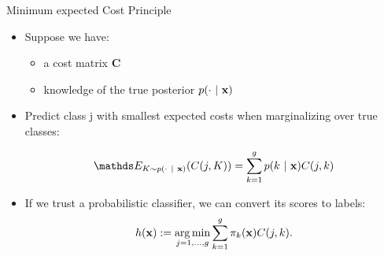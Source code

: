 \documentclass[10pt,compress,t,notes=noshow, xcolor=table]{beamer}
\begin{document}
\begin{frame}{Minimum expected Cost Principle}


		\begin{itemize}
		
			\item Suppose we have:
            \begin{itemize}
                \item a cost matrix $\mathbf{C}$
                
                \item knowledge of the true posterior $p(\cdot ~|~ \mathbf{x})$
            \end{itemize}

                

			\item Predict class j with smallest expected costs when marginalizing over true classes:
	
			$$ 	\E_{K \sim p(\cdot ~|~ \xv)}( C(j,K) ) = \sumkg p(k ~|~ \xv) C(j,k)	$$
	
		\end{itemize}

    \begin{itemize}
        \item If we trust a probabilistic classifier, we can convert its scores to labels:
		$$  h(\mathbf{x}) := \mathop{\mathrm{arg\,min}}\limits_{j=1,\ldots,g} \sum\limits_{k=1}^g 	\pi_{k}(\mathbf{x}) C(j,k). $$
 
        

\end{itemize}
\end{frame}
\end{document}
